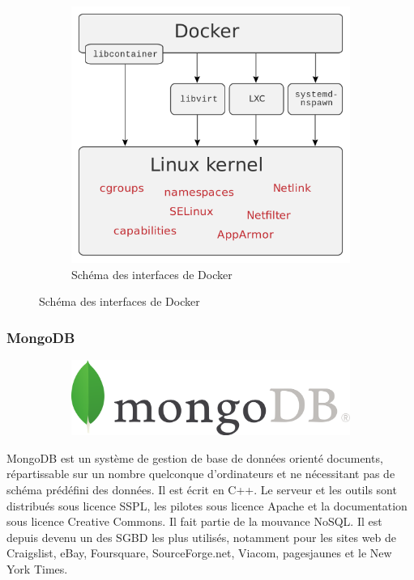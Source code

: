 \documentclass{article}
\begin{document}
\begin{figure}[h!]
	\centering
  	\begin{subfigure}[b]{0.55\linewidth}
	\includegraphics[width=\linewidth]{dockeri.png}
	\caption{Schéma des interfaces de Docker}
  	\end{subfigure}
\end{figure}
\newpage

\subsubsection{MongoDB}
\begin{figure}[h!]
	\centering
  	\begin{subfigure}[b]{0.55\linewidth}
	\includegraphics[width=\linewidth]{mongo.png}
  	\end{subfigure}
\end{figure}

MongoDB est un système de gestion de base de données orienté documents, répartissable sur un nombre quelconque d'ordinateurs et ne nécessitant pas de schéma prédéfini des données. Il est écrit en C++. Le serveur et les outils sont distribués sous licence SSPL, les pilotes sous licence Apache et la documentation sous licence Creative Commons. Il fait partie de la mouvance NoSQL. 
\newline
Il est depuis devenu un des SGBD les plus utilisés, notamment pour les sites web de Craigslist, eBay, Foursquare, SourceForge.net, Viacom, pagesjaunes et le New York Times. 
\end{document}
